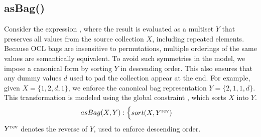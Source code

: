 \subsection{asBag()}
\smallskip
\noindent
\label{ssec:asBag}
Consider the expression , where the result is evaluated as a multiset $Y$ that preserves all values from the source collection $X$, including repeated elements. Because OCL bags are insensitive to permutations, multiple orderings of the same values are semantically equivalent. To avoid such symmetries in the model, we impose a canonical form by sorting $Y$ in descending order. This also ensures that any dummy values $d$ used to pad the collection appear at the end. For example, given $X=\{1,2,d,1\}$, we enforce the canonical bag representation $Y=\{2,1,1,d\}$. This transformation is modeled using the global constraint , which sorts $X$ into $Y$. 
\begin{equation}\label{csp:bag_XY}
asBag(X,Y):
\begin{cases}
sort(X,Y^{\text{rev}}) \\
\end{cases}
\end{equation}
$Y^{\text{rev}}$ denotes the reverse of $Y$, used to enforce descending order.

